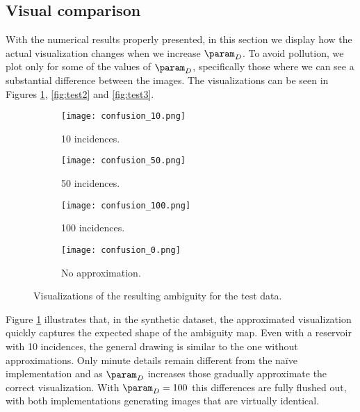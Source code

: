 \subsection{Visual comparison}
\label{sec:validation:visual}

With the numerical results properly presented, in this section we display how the actual visualization changes when we increase $\param_D$. To avoid pollution, we plot only for some of the values of $\param_D$, specifically those where we can see a substantial difference between the images. The visualizations can be seen in Figures \ref{fig:test1}, \ref{fig:test2} and \ref{fig:test3}.

\newpage

\begin{figure}[H]
    \centering
    \begin{subfigure}[b]{0.45\linewidth}
        \texttt{[image: confusion\_10.png]}
        \caption{10 incidences.}
    \end{subfigure}
    \begin{subfigure}[b]{0.45\linewidth}
        \texttt{[image: confusion\_50.png]}
        \caption{50 incidences.}
    \end{subfigure}
    \begin{subfigure}[b]{0.45\linewidth}
        \texttt{[image: confusion\_100.png]}
        \caption{100 incidences.}
    \end{subfigure}
    \begin{subfigure}[b]{0.45\linewidth}
        \texttt{[image: confusion\_0.png]}
        \caption{No approximation.}
    \end{subfigure}
    \caption{Visualizations of the resulting ambiguity for the test data.}
    \label{fig:test1}
\end{figure}

Figure \ref{fig:test1} illustrates that, in the synthetic dataset, the approximated visualization quickly captures the expected shape of the ambiguity map. Even with a reservoir with 10 incidences, the general drawing is similar to the one without approximations. Only minute details remain different from the na\"ive implementation and as $\param_D$ increases those gradually approximate the correct visualization. With $\param_D = 100$ this differences are fully flushed out, with both implementations generating images that are virtually identical.

\newpage

